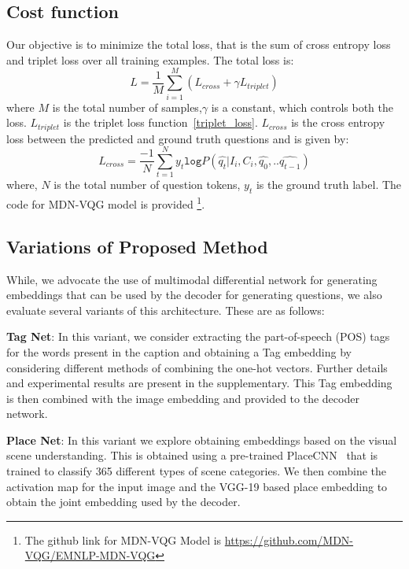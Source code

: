 \documentclass[11pt,a4paper]{article}
\begin{document}
\subsection{Cost function}
\noindent Our objective is to minimize the total loss, that is the sum of cross entropy loss and triplet loss over all training examples.
  The total loss is: 
  \begin{equation}
L= \frac{1}{M} \sum^{M}_{i=1} (L_{cross} + \gamma L_{triplet})
\end{equation}
where  $M$ is the total number of samples,$\gamma$ is a constant, which controls both the loss. $L_{triplet}$ is the triplet loss function~\ref{triplet_loss}. $L_{cross}$ is the cross entropy loss between the predicted and ground truth questions and is given by: 
 \begin{equation*}
L_{cross}=\frac{-1}{N}\sum_{t=1}^{N} {y_{t} \texttt{log} P(\hat{q_{t}}|I_i,C_i,{\hat{q_0},..\hat{q_{t-1}}})}
\end{equation*}
where, $N$ is the total number of question tokens, $y_t$ is the ground truth label. The code for  MDN-VQG model is provided \footnote{The github link for MDN-VQG Model is \url{https://github.com/MDN-VQG/EMNLP-MDN-VQG}}. 



\subsection{Variations of Proposed Method}
\label{subsec:variants}
While, we advocate the use of multimodal differential network for generating embeddings that can be used by the decoder for generating questions, we also evaluate several variants of this architecture. These are as follows:



\textbf{Tag Net}: In this variant, we consider extracting the part-of-speech (POS) tags for the words present in the caption and obtaining a Tag embedding by considering different methods of combining the one-hot vectors. Further details and experimental results are present in the supplementary.
This Tag embedding is then combined with the image embedding and provided to the decoder network.  

\textbf{Place Net}: In this variant we explore obtaining embeddings based on the visual scene understanding. This is obtained using a pre-trained PlaceCNN~\cite{Zhou_PAMI2017} that is trained to classify 365 different types of scene categories. We then combine the activation map for the input image and the VGG-19 based place embedding to obtain the joint embedding used by the decoder. 
\end{document}
